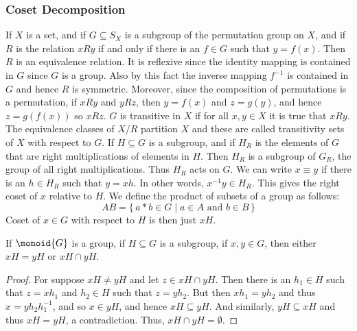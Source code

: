 \documentclass{article}                                                        %
\begin{document}
            \subsubsection{Coset Decomposition}
                If $X$ is a set, and if $G\subseteq{S}_{X}$ is a subgroup of the
                permutation group on $X$, and if $R$ is the relation
                $xRy$ if and only if there is an $f\in{G}$ such that
                $y=f(x)$. Then $R$ is an equivalence relation. It is reflexive
                since the identity mapping is contained in $G$ since $G$ is a
                group. Also by this fact the inverse mapping $f^{\minus{1}}$ is
                contained in $G$ and hence $R$ is symmetric. Moreover, since the
                composition of permutations is a permutation, if $xRy$ and
                $yRz$, then $y=f(x)$ and $z=g(y)$, and hence $z=g(f(x))$ so
                $xRz$. $G$ is transitive in $X$ if for all $x,y\in{X}$ it is
                true that $xRy$. The equivalence classes of $X/R$ partition $X$
                and these are called transitivity sets of $X$ with respect to
                $G$. If $H\subseteq{G}$ is a subgroup, and if $H_{R}$ is the
                elements of $G$ that are right multiplications of elements in
                $H$. Then $H_{R}$ is a subgroup of $G_{R}$, the group of all
                right multiplications. Thus $H_{R}$ acts on $G$. We can write
                $x\equiv{y}$ if there is an $h\in{H}_{R}$ such that $y=xh$. In
                other words, $x^{\minus{1}}y\in{H}_{R}$. This gives the right
                coset of $x$ relative to $H$. We define the product of subsets
                of a group as follows:
                \begin{equation}
                    AB=\{\,a*b\in{G}\;|\;a\in{A}\textrm{ and }b\in{B}\,\}
                \end{equation}
                Coset of $x\in{G}$ with respect to $H$ is then just $xH$.
                \begin{theorem}
                    If $\monoid{G}$ is a group, if $H\subseteq{G}$ is a
                    subgroup, if $x,y\in{G}$, then either $xH=yH$ or
                    $xH\cap{y}H$.
                \end{theorem}
                \begin{proof}
                    For suppose $xH\ne{y}H$ and let $z\in{x}H\cap{y}H$. Then
                    there is an $h_{1}\in{H}$ such that $z=xh_{1}$ and
                    $h_{2}\in{H}$ such that $z=yh_{2}$. But then
                    $xh_{1}=yh_{2}$ and thus $x=yh_{2}h_{1}^{\minus{1}}$, and
                    so $x\in{y}H$, and hence $xH\subseteq{y}H$. And similarly,
                    $yH\subseteq{x}H$ and thus $xH=yH$, a contradiction. Thus,
                    $xH\cap{y}H=\emptyset$.
                \end{proof}
\end{document}
